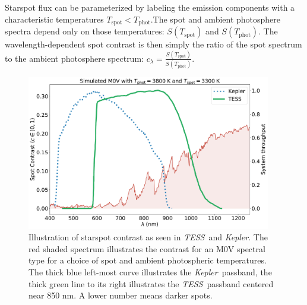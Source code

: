 \documentclass[twocolumn]{aastex631}
\newcommand{\tess}{{\it TESS}}
\newcommand{\kepler}{{\it Kepler}}
\begin{document}
Starspot flux can be parameterized by labeling the emission components with a characteristic temperatures
$T_\mathrm{spot}<T_\mathrm{phot}$.The spot and ambient photosphere spectra depend only on those temperatures: $S(T_\mathrm{spot})$ and $S(T_\mathrm{phot})$.  The wavelength-dependent spot contrast is then simply the ratio of the spot spectrum to the ambient photosphere spectrum:  $c_\lambda = \frac{S(T_\mathrm{spot})}{ S(T_\mathrm{phot})}$.

\begin{figure}[hbt!]
  \includegraphics[width=0.95\textwidth]{figures/contrast_spectrum2.pdf}
  \caption{Illustration of starspot contrast as seen in \tess\ and \kepler. The red shaded spectrum illustrates the contrast for an M0V spectral type for a choice of spot and ambient photospheric temperatures. The thick blue left-most curve illustrates the \kepler\ passband, the thick green line to its right illustrates the \tess\ passband centered near 850 nm.  A lower number means darker spots.  }
  \label{fig:filtercurve}
\end{figure}
\end{document}
